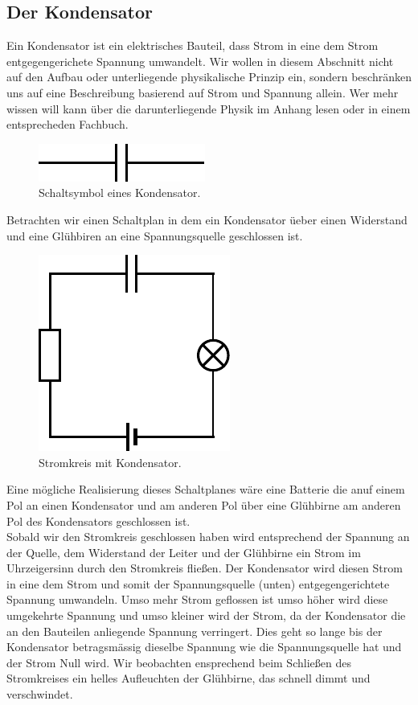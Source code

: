 \documentclass[11pt,a4paper,leqno]{report}
\numberwithin{equation}{chapter}
\begin{document}
\subsection{Der Kondensator}
 Ein Kondensator ist ein elektrisches Bauteil, dass Strom in eine dem Strom entgegengerichete Spannung umwandelt. Wir wollen in diesem Abschnitt nicht auf den Aufbau oder unterliegende physikalische Prinzip ein, sondern beschränken uns auf eine Beschreibung basierend auf Strom und Spannung allein. Wer mehr wissen will kann \"uber die darunterliegende Physik im Anhang lesen oder in einem entsprecheden Fachbuch.
  \begin{figure}[H]
 	\begin{center}
 		\includegraphics[scale=0.8]{kondens.pdf}
 		\caption{Schaltsymbol eines Kondensator.}
 	\end{center}
 \end{figure}
 \noindent
 Betrachten wir einen Schaltplan in dem ein Kondensator \"ueber einen Widerstand und eine Gl\"uhbiren an eine Spannungsquelle geschlossen ist. 
 \begin{figure}[H]
 	\begin{center}
 		\includegraphics[scale=0.8]{kondensator.pdf}
 		\caption{Stromkreis mit Kondensator.}
 	\end{center}
 \end{figure}
 \noindent
 Eine m\"ogliche Realisierung dieses Schaltplanes w\"are eine Batterie die anuf einem Pol an einen Kondensator und am anderen Pol \"uber eine Gl\"uhbirne am anderen Pol des Kondensators geschlossen ist.\\
 Sobald wir den Stromkreis geschlossen haben wird entsprechend der Spannung an der Quelle, dem Widerstand der Leiter und der Gl\"uhbirne ein Strom im Uhrzeigersinn durch den Stromkreis flie\ss{}en. Der Kondensator wird diesen Strom in eine dem Strom und somit der Spannungsquelle (unten) entgegengerichtete Spannung umwandeln. Umso mehr Strom geflossen ist umso h\"oher wird diese umgekehrte Spannung und umso kleiner wird der Strom, da der Kondensator die an den Bauteilen anliegende Spannung verringert. Dies geht so lange bis der Kondensator betragsm\"assig dieselbe Spannung wie die Spannungsquelle hat und der Strom Null wird. Wir beobachten ensprechend beim Schlie\ss{}en des Stromkreises ein helles Aufleuchten der Gl\"uhbirne, das schnell dimmt und verschwindet.\\
\end{document}
